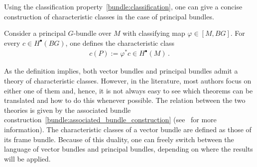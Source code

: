     Using the classification property~\ref{bundle:classification}, one can give a concise construction of characteristic classes in the case of principal bundles.
    \begin{construct}
        Consider a principal $G$-bundle over $M$ with classifying map $\varphi\in[M,BG]$. For every $c\in H^\bullet(BG)$, one defines the characteristic class
        \begin{gather}
            c(P):=\varphi^*c\in H^\bullet(M)\,.
        \end{gather}
    \end{construct}

    As the definition implies, both vector bundles and principal bundles admit a theory of characteristic classes. However, in the literature, most authors focus on either one of them and, hence, it is not always easy to see which theorems can be translated and how to do this whenever possible. The relation between the two theories is given by the associated bundle construction~\ref{bundle:associated_bundle_construction} (see~\citet{sorensen_introduction_2017} for more information). The characteristic classes of a vector bundle are defined as those of its frame bundle. Because of this duality, one can freely switch between the language of vector bundles and principal bundles, depending on where the results will be applied.

